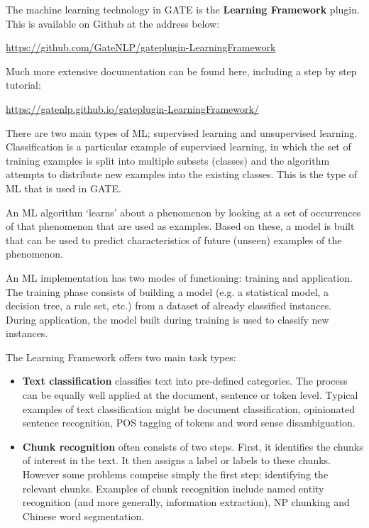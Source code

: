 

The machine learning technology in GATE is the \textbf{Learning
Framework} plugin. This is available on Github at the address below:

\url{https://github.com/GateNLP/gateplugin-LearningFramework}

Much more extensive documentation can be found here, including a step
by step tutorial:

\url{https://gatenlp.github.io/gateplugin-LearningFramework/}

There are two main types of ML; supervised learning and unsupervised
learning. Classification is a particular example of supervised
learning, in which the set of training examples is split into multiple
subsets (classes) and the algorithm attempts to distribute new
examples into the existing classes. This is the type of ML that is
used in GATE.

An ML algorithm `learns' about a phenomenon by looking at a set of occurrences
of that phenomenon that are used as examples. Based on these, a model is built
that can be used to predict characteristics of future (unseen) examples of the
phenomenon.

An ML implementation has two modes of functioning: training and application.  The
training phase consists of building a model (e.g. a statistical model, a decision
tree, a rule set, etc.) from a dataset of already classified instances.  During
application, the model built during training is used to classify new instances.

The Learning Framework offers two main task types:

\begin{itemize}
  
\item {\bf Text classification}
classifies text into pre-defined categories. The process can be
equally well applied at the document, sentence or token level. Typical
examples of text classification might be document classification,
opinionated sentence recognition, POS tagging of tokens and word sense
disambiguation.

\item {\bf Chunk recognition} often consists of two steps. First, it identifies
the chunks of interest in the text. It then assigns a label or labels to these
chunks. However some problems comprise simply the first step; identifying the
relevant chunks. Examples of chunk recognition include named entity recognition
(and more generally, information extraction), NP chunking and Chinese word
segmentation.

\end{itemize}

